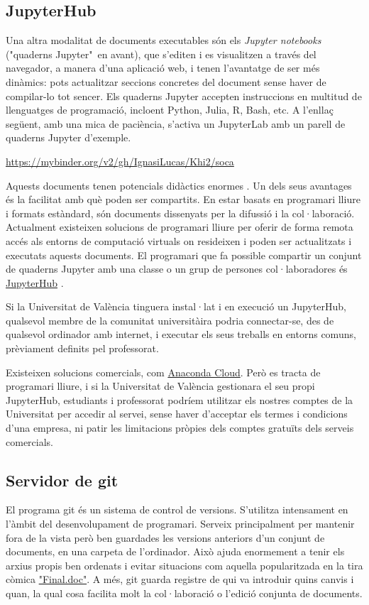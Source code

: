 \documentclass[a4paper,12pt]{article}
\begin{document}
\subsection{JupyterHub}
Una altra modalitat de documents executables són els \emph{Jupyter notebooks}
("quaderns Jupyter"\ en avant), que s'editen
i es visualitzen a través del navegador, a manera d'una aplicació web, i tenen l'avantatge
de ser més dinàmics: pots actualitzar seccions concretes del document sense haver de compilar-lo
tot sencer. Els quaderns Jupyter accepten instruccions en multitud de llenguatges de
programació, incloent Python, Julia, \textsf{R}, Bash, etc. A l'enllaç següent, amb una
mica de paciència, s'activa un JupyterLab amb un parell de quaderns Jupyter d'exemple.

\href{https://mybinder.org/v2/gh/IgnasiLucas/Khi2/soca}{https://mybinder.org/v2/gh/IgnasiLucas/Khi2/soca}

Aquests documents tenen potencials didàctics enormes \cite{Barba2019}. Un dels seus avantages
és la facilitat amb què poden ser compartits. En estar basats en programari lliure i formats
estàndard, són documents dissenyats per la difussió i la col·laboració. Actualment existeixen
solucions de programari lliure per oferir de forma remota accés als entorns de computació
virtuals on resideixen i poden ser actualitzats i executats aquests documents. El programari
que fa possible compartir un conjunt de quaderns Jupyter amb una classe o un grup
de persones col·laboradores és \href{https://jupyter.org/hub}{JupyterHub} \cite{JupyterHub}.

Si la Universitat de València tinguera instal·lat i en execució un JupyterHub, qualsevol
membre de la comunitat universitàira podria connectar-se, des de qualsevol ordinador amb
internet, i executar els seus treballs en entorns comuns, prèviament definits pel
professorat.

Existeixen solucions comercials, com \href{https://anaconda.cloud/}{Anaconda Cloud}. Però
es tracta de programari lliure, i si la Universitat de València gestionara el seu propi
JupyterHub, estudiants i professorat podríem utilitzar els nostres comptes de la Universitat
per accedir al servei, sense haver d'acceptar els termes i condicions d'una empresa, ni
patir les limitacions pròpies dels comptes gratuïts dels serveis comercials.

\subsection{Servidor de \textsf{git}}
El programa \textsf{git} és un sistema de control de versions. S'utilitza intensament en
l'àmbit del desenvolupament de programari. Serveix principalment per mantenir fora de la
vista però ben guardades les versions anteriors d'un conjunt de documents, en una carpeta
de l'ordinador. Això ajuda enormement a tenir els arxius propis ben ordenats i evitar
situacions com aquella popularitzada en la tira còmica
\href{https://phdcomics.com/comics/archive.php?comicid=1531}{"Final.doc"}. A més, \textsf{git}
guarda registre de qui va introduir quins canvis i quan, la qual cosa facilita molt la
col·laboració o l'edició conjunta de documents.
\end{document}
